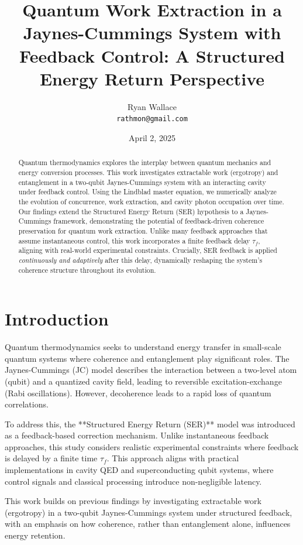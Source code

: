 \documentclass[a4paper,11pt]{article}
\title{Quantum Work Extraction in a Jaynes-Cummings System with Feedback Control: A Structured Energy Return Perspective}
\author{Ryan Wallace \\ \texttt{rathmon@gmail.com}}
\date{April 2, 2025}
\begin{document}
\maketitle

\begin{abstract}
Quantum thermodynamics explores the interplay between quantum mechanics and energy conversion processes. This work investigates extractable work (ergotropy) and entanglement in a two-qubit Jaynes-Cummings system with an interacting cavity under feedback control. Using the Lindblad master equation, we numerically analyze the evolution of concurrence, work extraction, and cavity photon occupation over time. Our findings extend the Structured Energy Return (SER) hypothesis to a Jaynes-Cummings framework, demonstrating the potential of feedback-driven coherence preservation for quantum work extraction. Unlike many feedback approaches that assume instantaneous control, this work incorporates a finite feedback delay $\tau_f$, aligning with real-world experimental constraints. Crucially, SER feedback is applied \textit{continuously and adaptively} after this delay, dynamically reshaping the system’s coherence structure throughout its evolution.
\end{abstract}

\section{Introduction}
Quantum thermodynamics seeks to understand energy transfer in small-scale quantum systems where coherence and entanglement play significant roles. The Jaynes-Cummings (JC) model \cite{JaynesCummings} describes the interaction between a two-level atom (qubit) and a quantized cavity field, leading to reversible excitation-exchange (Rabi oscillations). However, decoherence leads to a rapid loss of quantum correlations.

To address this, the **Structured Energy Return (SER)** model was introduced as a feedback-based correction mechanism. \cite{WallaceSER2025} Unlike instantaneous feedback approaches, this study considers realistic experimental constraints where feedback is delayed by a finite time $\tau_f$. This approach aligns with practical implementations in cavity QED and superconducting qubit systems, where control signals and classical processing introduce non-negligible latency.

This work builds on previous findings by investigating extractable work (ergotropy) in a two-qubit Jaynes-Cummings system under structured feedback, with an emphasis on how coherence, rather than entanglement alone, influences energy retention.
\end{document}
